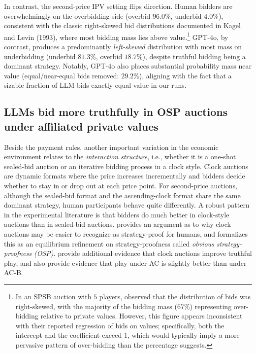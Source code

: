 In contrast, the second-price IPV setting flips direction. Human bidders are overwhelmingly on the overbidding side (overbid $96.0\%$, underbid $4.0\%$), consistent with the classic right-skewed bid distributions documented in Kagel and Levin (1993), where most bidding mass lies above value.\footnote{In an SPSB auction with $5$ players, \citet{kagel1993independent} observed that the distribution of bids was right-skewed, with the majority of the bidding mass (67\%) representing over-bidding relative to private values. However, this figure appears inconsistent with their reported regression of bids on values; specifically, both the intercept and the coefficient exceed 1, which would typically imply a more pervasive pattern of over-bidding than the percentage suggests.} GPT-4o, by contrast, produces a predominantly \emph{left-skewed} distribution with most mass on underbidding (underbid $81.3\%$, overbid $18.7\%$), despite truthful bidding being a dominant strategy. Notably, GPT-4o also places substantial probability mass near value (equal/near-equal bids removed: $29.2\%$), aligning with the fact that a sizable fraction of LLM bids exactly equal value in our runs.



\subsection{LLMs bid more truthfully in OSP auctions under affiliated private values}\label{session:OSP}


Beside the payment rules, another important variation in the economic environment  relates to the {\em interaction structure}, i.e., whether it is a one-shot sealed-bid auction or an iterative bidding process in a clock style. 
Clock auctions are dynamic formats where the price increases incrementally and bidders decide whether to stay in or drop out at each price point. 
For second-price auctions, although the sealed-bid format and the ascending-clock format share the same dominant strategy, human participants behave quite differently. 
A robust pattern in the experimental literature is that bidders do much better in clock-style auctions than in sealed-bid auctions. \citet{li2017obviously} provides an argument as to why clock auctions may be easier to recognize as strategy-proof for humans, and formalizes this as an equilibrium refinement on strategy-proofness called {\em obvious strategy-proofness (OSP)}. 
\citet{breitmoser2022obviousness} provide additional evidence that clock auctions improve truthful play, and also provide evidence that play under AC is slightly better than under AC-B. 


